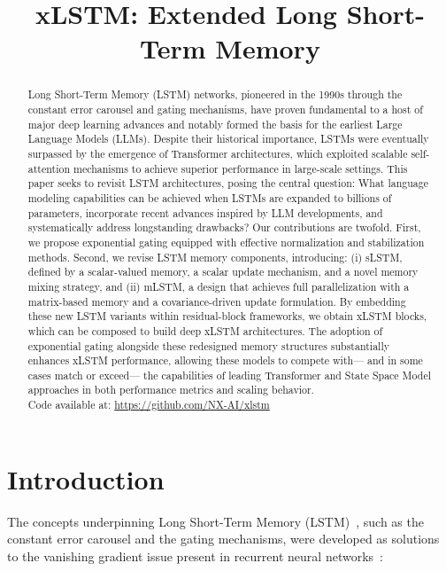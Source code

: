\title{xLSTM: Extended Long Short-Term Memory}

\begin{abstract}
Long Short-Term Memory (LSTM) networks, pioneered in the 1990s through the constant error carousel and gating mechanisms, have proven fundamental to a host of major deep learning advances and notably formed the basis for the earliest Large Language Models (LLMs). Despite their historical importance, LSTMs were eventually surpassed by the emergence of Transformer architectures, which exploited scalable self-attention mechanisms to achieve superior performance in large-scale settings. This paper seeks to revisit LSTM architectures, posing the central question: What language modeling capabilities can be achieved when LSTMs are expanded to billions of parameters, incorporate recent advances inspired by LLM developments, and systematically address longstanding drawbacks? Our contributions are twofold. First, we propose exponential gating equipped with effective normalization and stabilization methods. Second, we revise LSTM memory components, introducing: (i) sLSTM, defined by a scalar-valued memory, a scalar update mechanism, and a novel memory mixing strategy, and (ii) mLSTM, a design that achieves full parallelization with a matrix-based memory and a covariance-driven update formulation. By embedding these new LSTM variants within residual-block frameworks, we obtain xLSTM blocks, which can be composed to build deep xLSTM architectures. The adoption of exponential gating alongside these redesigned memory structures substantially enhances xLSTM performance, allowing these models to compete with— and in some cases match or exceed— the capabilities of leading Transformer and State Space Model approaches in both performance metrics and scaling behavior.\\
Code available at: \url{https://github.com/NX-AI/xlstm}
\end{abstract}

\section{Introduction}
\label{sec:intro}

The concepts underpinning Long Short-Term Memory (LSTM)~\citep{Hochreiter:91,Hochreiter:97nips,Hochreiter:97}, such as the constant error carousel and the gating mechanisms, were developed as solutions to the vanishing gradient issue present in recurrent neural networks~\citep{Hochreiter:91,Hochreiter:00book}:

